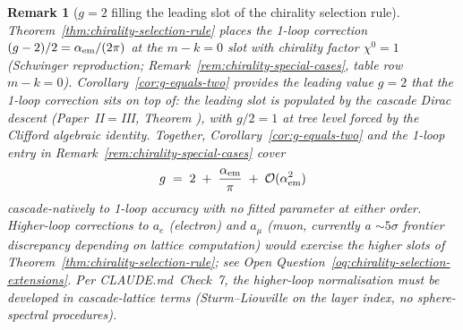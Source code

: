 \documentclass[12pt,a4paper]{article}
\newtheorem*{remark}{Remark}
\begin{document}
\begin{remark}[$g = 2$ filling the leading slot of the chirality
selection rule]\label{rem:g-2-leading}
Theorem~\ref{thm:chirality-selection-rule} places the 1-loop
correction $(g-2)/2 = \alpha_{\rm em}/(2\pi)$ at the $m-k = 0$ slot
with chirality factor $\chi^0 = 1$ (Schwinger reproduction;
Remark~\ref{rem:chirality-special-cases}, table row $m - k = 0$).
Corollary~\ref{cor:g-equals-two} provides the leading value $g = 2$
that the 1-loop correction sits on top of: the leading slot is
populated by the cascade Dirac descent (Paper~II$=$III, Theorem
), with $g/2 = 1$ at tree level
forced by the Clifford algebraic identity. Together,
Corollary~\ref{cor:g-equals-two} and the 1-loop entry in
Remark~\ref{rem:chirality-special-cases} cover
\[
g \;=\; 2 \;+\; \frac{\alpha_{\rm em}}{\pi} \;+\; \mathcal{O}(\alpha_{\rm em}^2)
\]
cascade-natively to 1-loop accuracy with no fitted parameter at
either order. Higher-loop corrections to $a_e$ (electron) and
$a_\mu$ (muon, currently a $\sim 5\sigma$ frontier discrepancy
depending on lattice computation) would exercise the higher slots
of Theorem~\ref{thm:chirality-selection-rule}; see Open
Question~\ref{oq:chirality-selection-extensions}. Per
CLAUDE.md~Check~7, the higher-loop normalisation must be developed
in cascade-lattice terms (Sturm--Liouville on the layer index, no
sphere-spectral procedures).
\end{remark}
\end{document}
